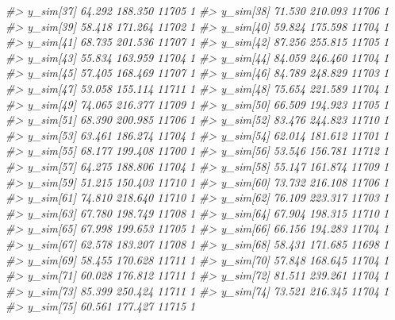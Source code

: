\documentclass[
  10pt,
  italian,
  a4paper,
  extrafontsizes,onecolumn,openright
  ]{memoir}
\newenvironment{Shaded}{\begin{snugshade}}{\end{snugshade}}
\newcommand{\CommentTok}[1]{\textcolor[rgb]{0.56,0.35,0.01}{\textit{#1}}}
\begin{document}
\begin{Shaded}
\begin{Highlighting}[]
\CommentTok{\#\textgreater{} y\_sim[37]  64.292 188.350 11705    1}
\CommentTok{\#\textgreater{} y\_sim[38]  71.530 210.093 11706    1}
\CommentTok{\#\textgreater{} y\_sim[39]  58.418 171.264 11702    1}
\CommentTok{\#\textgreater{} y\_sim[40]  59.824 175.598 11704    1}
\CommentTok{\#\textgreater{} y\_sim[41]  68.735 201.536 11707    1}
\CommentTok{\#\textgreater{} y\_sim[42]  87.256 255.815 11705    1}
\CommentTok{\#\textgreater{} y\_sim[43]  55.834 163.959 11704    1}
\CommentTok{\#\textgreater{} y\_sim[44]  84.059 246.460 11704    1}
\CommentTok{\#\textgreater{} y\_sim[45]  57.405 168.469 11707    1}
\CommentTok{\#\textgreater{} y\_sim[46]  84.789 248.829 11703    1}
\CommentTok{\#\textgreater{} y\_sim[47]  53.058 155.114 11711    1}
\CommentTok{\#\textgreater{} y\_sim[48]  75.654 221.589 11704    1}
\CommentTok{\#\textgreater{} y\_sim[49]  74.065 216.377 11709    1}
\CommentTok{\#\textgreater{} y\_sim[50]  66.509 194.923 11705    1}
\CommentTok{\#\textgreater{} y\_sim[51]  68.390 200.985 11706    1}
\CommentTok{\#\textgreater{} y\_sim[52]  83.476 244.823 11710    1}
\CommentTok{\#\textgreater{} y\_sim[53]  63.461 186.274 11704    1}
\CommentTok{\#\textgreater{} y\_sim[54]  62.014 181.612 11701    1}
\CommentTok{\#\textgreater{} y\_sim[55]  68.177 199.408 11700    1}
\CommentTok{\#\textgreater{} y\_sim[56]  53.546 156.781 11712    1}
\CommentTok{\#\textgreater{} y\_sim[57]  64.275 188.806 11704    1}
\CommentTok{\#\textgreater{} y\_sim[58]  55.147 161.874 11709    1}
\CommentTok{\#\textgreater{} y\_sim[59]  51.215 150.403 11710    1}
\CommentTok{\#\textgreater{} y\_sim[60]  73.732 216.108 11706    1}
\CommentTok{\#\textgreater{} y\_sim[61]  74.810 218.640 11710    1}
\CommentTok{\#\textgreater{} y\_sim[62]  76.109 223.317 11703    1}
\CommentTok{\#\textgreater{} y\_sim[63]  67.780 198.749 11708    1}
\CommentTok{\#\textgreater{} y\_sim[64]  67.904 198.315 11710    1}
\CommentTok{\#\textgreater{} y\_sim[65]  67.998 199.653 11705    1}
\CommentTok{\#\textgreater{} y\_sim[66]  66.156 194.283 11704    1}
\CommentTok{\#\textgreater{} y\_sim[67]  62.578 183.207 11708    1}
\CommentTok{\#\textgreater{} y\_sim[68]  58.431 171.685 11698    1}
\CommentTok{\#\textgreater{} y\_sim[69]  58.455 170.628 11711    1}
\CommentTok{\#\textgreater{} y\_sim[70]  57.848 168.645 11704    1}
\CommentTok{\#\textgreater{} y\_sim[71]  60.028 176.812 11711    1}
\CommentTok{\#\textgreater{} y\_sim[72]  81.511 239.261 11704    1}
\CommentTok{\#\textgreater{} y\_sim[73]  85.399 250.424 11711    1}
\CommentTok{\#\textgreater{} y\_sim[74]  73.521 216.345 11704    1}
\CommentTok{\#\textgreater{} y\_sim[75]  60.561 177.427 11715    1}

\end{Highlighting}
\end{Shaded}
\end{document}
